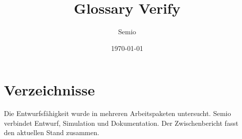 \documentclass[type=report,theme=light,language=de]{semio}
\title{Glossary Verify}
\author{Semio}
\date{\today}
\begin{document}
\maketitle

\chapter{Verzeichnisse}
Die \Gls{Entwurfsfähigkeit} wurde in mehreren Arbeitspaketen untersucht.
\Gls{Semio} verbindet Entwurf, Simulation und Dokumentation.
Der \Gls{Zwischenbericht} fasst den aktuellen Stand zusammen.

\listofglossaries
\end{document}
